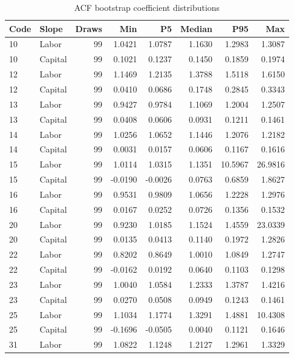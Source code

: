 \begin{table}[H]
\centering
\caption{ACF bootstrap coefficient distributions}
\begingroup\fontsize{9.2}{11.2}\selectfont
\setlength{\tabcolsep}{4.3pt}\renewcommand{\arraystretch}{1.1}
\begin{tabular}{llrrrrrr}
\toprule
Code & Slope & Draws & Min & P5 & Median & P95 & Max \\
\midrule
10 & Labor & 99 & 1.0421 & 1.0787 & 1.1630 & 1.2983 & 1.3087 \\
10 & Capital & 99 & 0.1021 & 0.1237 & 0.1450 & 0.1859 & 0.1974 \\
12 & Labor & 99 & 1.1469 & 1.2135 & 1.3788 & 1.5118 & 1.6150 \\
12 & Capital & 99 & 0.0410 & 0.0686 & 0.1748 & 0.2845 & 0.3343 \\
13 & Labor & 99 & 0.9427 & 0.9784 & 1.1069 & 1.2004 & 1.2507 \\
13 & Capital & 99 & 0.0408 & 0.0606 & 0.0931 & 0.1211 & 0.1461 \\
14 & Labor & 99 & 1.0256 & 1.0652 & 1.1446 & 1.2076 & 1.2182 \\
14 & Capital & 99 & 0.0031 & 0.0157 & 0.0606 & 0.1167 & 0.1616 \\
15 & Labor & 99 & 1.0114 & 1.0315 & 1.1351 & 10.5967 & 26.9816 \\
15 & Capital & 99 & -0.0190 & -0.0026 & 0.0763 & 0.6859 & 1.8627 \\
16 & Labor & 99 & 0.9531 & 0.9809 & 1.0656 & 1.2228 & 1.2976 \\
16 & Capital & 99 & 0.0167 & 0.0252 & 0.0726 & 0.1356 & 0.1532 \\
20 & Labor & 99 & 0.9230 & 1.0185 & 1.1524 & 1.4559 & 23.0339 \\
20 & Capital & 99 & 0.0135 & 0.0413 & 0.1140 & 0.1972 & 1.2826 \\
22 & Labor & 99 & 0.8202 & 0.8649 & 1.0010 & 1.0849 & 1.2747 \\
22 & Capital & 99 & -0.0162 & 0.0192 & 0.0640 & 0.1103 & 0.1298 \\
23 & Labor & 99 & 1.0040 & 1.0584 & 1.2333 & 1.3787 & 1.4216 \\
23 & Capital & 99 & 0.0270 & 0.0508 & 0.0949 & 0.1243 & 0.1461 \\
25 & Labor & 99 & 1.1034 & 1.1774 & 1.3291 & 1.4881 & 10.4308 \\
25 & Capital & 99 & -0.1696 & -0.0505 & 0.0040 & 0.1121 & 0.1646 \\
31 & Labor & 99 & 1.0822 & 1.1248 & 1.2127 & 1.2961 & 1.3329 \\

\end{tabular}
\end{table}
